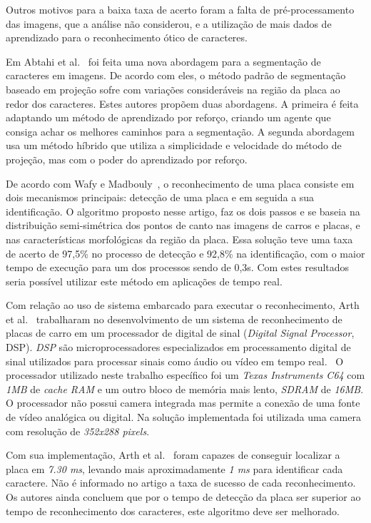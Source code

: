 Outros motivos para a baixa taxa de acerto foram a falta de pré-processamento
das imagens, que a análise não considerou, e a utilização de mais dados de
aprendizado para o reconhecimento ótico de caracteres.

Em Abtahi et al.~\cite{abtahi2015deep} foi feita uma nova abordagem para a
segmentação de caracteres em imagens. De acordo com eles, o método padrão de
segmentação baseado em projeção sofre com variações consideráveis na região da
placa ao redor dos caracteres. Estes autores propõem duas abordagens. A primeira
é feita adaptando um método de aprendizado por reforço, criando um agente que
consiga achar os melhores caminhos para a segmentação.  A segunda abordagem usa
um método híbrido que utiliza a simplicidade e velocidade do método de projeção,
mas com o poder do aprendizado por reforço.

De acordo com Wafy e Madbouly~\cite{wafy2016efficient}, o reconhecimento de uma
placa consiste em dois mecanismos principais: detecção de uma placa e em seguida
a sua identificação. O algoritmo proposto nesse artigo, faz os dois passos e se
baseia na distribuição semi-simétrica dos pontos de canto nas imagens de carros
e placas, e nas características morfológicas da região da placa. Essa solução
teve uma taxa de acerto de 97,5\% no processo de detecção e 92,8\% na
identificação, com o maior tempo de execução para um dos processos sendo de
0,3s. Com estes resultados seria possível utilizar este método em aplicações de
tempo real.

Com relação ao uso de sistema embarcado para executar o reconhecimento, Arth et
al.~\cite{arth2007real} trabalharam no desenvolvimento de um sistema de reconhecimento
de placas de carro em um processador de digital de sinal (\emph{Digital Signal Processor}, DSP).
\emph{DSP} são microprocessadores especializados em processamento digital de sinal utilizados para
processar sinais como áudio ou vídeo em tempo real.~\cite{yovits1993advances} O processador utilizado
neste trabalho específico foi um \emph{Texas Instruments C64} com \emph{1MB} de \emph{cache RAM} e um outro bloco
de memória mais lento, \emph{SDRAM} de \emph{16MB}. O processador não possui camera integrada mas permite a conexão de
uma fonte de vídeo analógica ou digital. Na solução implementada foi utilizada uma camera com resolução de \emph{352x288 pixels}.

Com sua implementação, Arth et al.~\cite{arth2007real} foram capazes de conseguir localizar a placa em
\emph{7.30 ms}, levando mais aproximadamente \emph{1 ms} para identificar cada caractere. Não é informado no artigo
a taxa de sucesso de cada reconhecimento. Os autores ainda concluem que por o tempo de detecção da placa ser superior
ao tempo de reconhecimento dos caracteres, este algoritmo deve ser melhorado.

